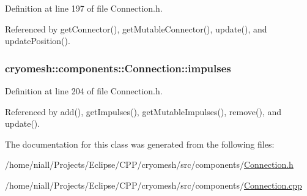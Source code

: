 \-Definition at line 197 of file \-Connection.\-h.



\-Referenced by get\-Connector(), get\-Mutable\-Connector(), update(), and update\-Position().

\hypertarget{classcryomesh_1_1components_1_1Connection_a00323e7080eba7a1bfae022915022f47}{
\subsubsection[{impulses}]{ {\bf cryomesh\-::components\-::\-Connection\-::impulses}}}\label{classcryomesh_1_1components_1_1Connection_a00323e7080eba7a1bfae022915022f47}


\-Definition at line 204 of file \-Connection.\-h.



\-Referenced by add(), get\-Impulses(), get\-Mutable\-Impulses(), remove(), and update().



\-The documentation for this class was generated from the following files\-:\begin{DoxyCompactItemize}
\item 
/home/niall/\-Projects/\-Eclipse/\-C\-P\-P/cryomesh/src/components/\hyperlink{Connection_8h}{\-Connection.\-h}\item 
/home/niall/\-Projects/\-Eclipse/\-C\-P\-P/cryomesh/src/components/\hyperlink{Connection_8cpp}{\-Connection.\-cpp}\end{DoxyCompactItemize}
